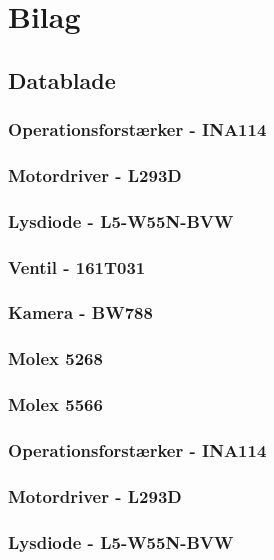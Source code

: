 \chapter{Bilag}
\section{Datablade}
\subsection{Operationsforstærker - INA114}
\label{bilag:INA114}

\subsection{Motordriver - L293D}
\label{bilag:L293D}

\subsection{Lysdiode - L5-W55N-BVW}
\label{bilag:L5-W55N-BVW}

\subsection{Ventil - 161T031}
\label{bilag:ventil}

\subsection{Kamera - BW788}

\subsection{Molex 5268}

\subsection{Molex 5566}\subsection{Operationsforstærker - INA114}
\label{bilag:INA114}

\subsection{Motordriver - L293D}
\label{bilag:L293D}

\subsection{Lysdiode - L5-W55N-BVW}
\label{bilag:L5-W55N-BVW}

